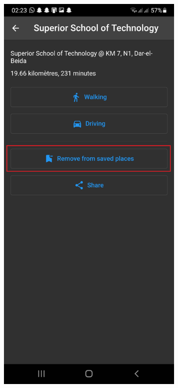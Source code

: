 \begin{figure}[!htbp]
\begin{subfigure}[t]{.3\linewidth}
        \caption{}
    \end{subfigure}
    \hfill
    \begin{subfigure}[t]{.3\linewidth}
        \centering
         \includegraphics[width=\textwidth]{assets/app/favourites/after.png}

\end{subfigure}
\end{figure}
